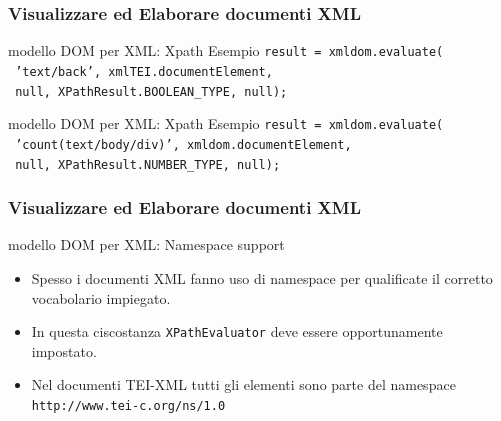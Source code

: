 \begin{frame}
    \frametitle{Visualizzare ed Elaborare documenti XML}
    \addtocounter{nframe}{1}
    

    \begin{block}{modello DOM per XML: Xpath Esempio}
        \texttt{result = xmldom.evaluate(}
         \\\texttt{ 'text/back', xmlTEI.documentElement, }
         \\\texttt{ null, XPathResult.BOOLEAN_TYPE, null);}
    \end{block}

     \begin{block}{modello DOM per XML: Xpath Esempio}
        \texttt{result = xmldom.evaluate(}
        \\\texttt{  'count(text/body/div)', xmldom.documentElement,} 
        \\\texttt{  null, XPathResult.NUMBER_TYPE, null);}
     \end{block}
     
\end{frame}

\begin{frame}
    \frametitle{Visualizzare ed Elaborare documenti XML}
    \addtocounter{nframe}{1}
    

    \begin{block}{modello DOM per XML: Namespace support}
        \begin{itemize}
            \item Spesso i documenti XML fanno uso di namespace per qualificate il corretto vocabolario impiegato.
            \item In questa ciscostanza \texttt{XPathEvaluator} deve essere opportunamente impostato.
            \item Nel documenti TEI-XML tutti gli elementi sono parte del namespace \texttt{http://www.tei-c.org/ns/1.0}
        \end{itemize}
        
    \end{block}
     
\end{frame}


